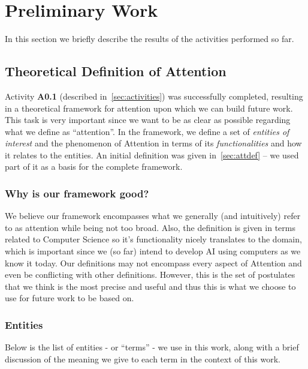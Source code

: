 \documentclass[12pt]{article}
\begin{document}
\section{Preliminary Work}
In this section we briefly describe the results of the activities performed so far.

\subsection{Theoretical Definition of Attention}
Activity \textbf{A0.1} (described in~\ref{sec:activities}) was successfully completed,
resulting in a theoretical framework for attention upon which we can build future work.
This task is very important since we want to be as clear as possible regarding what we define as ``attention''.
In the framework, we define a set of \emph{entities of interest} and the phenomenon of Attention in terms of
its \emph{functionalities} and how it relates to the entities.
An initial definition was given in~\ref{sec:attdef} -- we used part of it as a basis for the complete framework.

\subsubsection{Why is our framework good?}
We believe our framework encompasses what we generally (and intuitively) refer to as attention while being not too broad.
Also, the definition is given in terms related to Computer Science so it’s functionality nicely translates to the domain,
which is important since we (so far) intend to develop AI using computers as we know it today.
Our definitions may not encompass every aspect of Attention and even be conflicting with other definitions.
However, this is the set of postulates that we think is the most precise and useful and thus this is
what we choose to use for future work to be based on.

\subsubsection{Entities}
Below is the list of entities - or “terms” - we use in this work, along with a brief discussion of the meaning
we give to each term in the context of this work.
\end{document}
